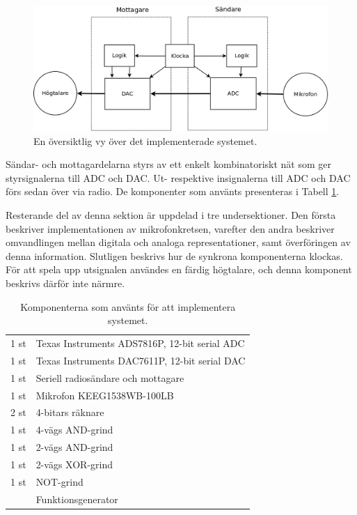 \documentclass[a4paper,10pt]{article}
\begin{document}
\begin{figure}[h]
    \centering
    \includegraphics[width=\textwidth]{sysoversikt.png}
    \caption{En översiktlig vy över det implementerade systemet.}
    \label{fig:sysoversikt}
\end{figure}

Sändar- och mottagardelarna styrs av ett enkelt kombinatoriskt nät som ger 
styrsignalerna till ADC och DAC. Ut- respektive insignalerna till ADC och DAC
förs sedan över via radio. De komponenter som använts presenteras i Tabell 
\ref{tab:komponenter}. 

Resterande del av denna sektion är uppdelad i tre undersektioner. Den första beskriver implementationen av mikrofonkretsen, varefter den andra beskriver omvandlingen mellan digitala och analoga representationer, samt överföringen av denna information. Slutligen beskrivs hur de synkrona komponenterna klockas. För att spela upp utsignalen användes en färdig högtalare, och denna komponent beskrivs därför inte närmre.

\begin{table}[h]
    \centering
    \begin{tabular}{|l|l|}
    \hline
    1 st & Texas Instruments ADS7816P, 12-bit serial ADC \\
    1 st & Texas Instruments DAC7611P, 12-bit serial DAC \\
    1 st & Seriell radiosändare och mottagare \\
    1 st & Mikrofon KEEG1538WB-100LB \\
    2 st & 4-bitars räknare \\
    1 st & 4-vägs AND-grind\\
    1 st & 2-vägs AND-grind \\
    1 st & 2-vägs XOR-grind \\
    1 st & NOT-grind \\
	 & Funktionsgenerator \\
    \hline
    \end{tabular}
    
    \caption{Komponenterna som använts för att implementera systemet.}
    \label{tab:komponenter}

\end{table}
\end{document}
